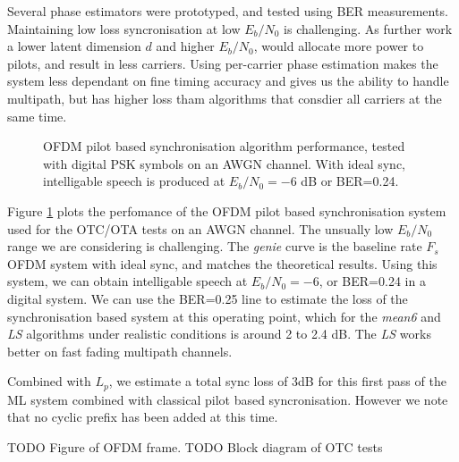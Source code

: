 \documentclass{article}
\begin{document}
Several phase estimators were prototyped, and tested using BER measurements. Maintaining low loss syncronisation at low $E_b/N_0$ is challenging.  As further work a lower latent dimension $d$ and higher $E_b/N_0$, would allocate more power to pilots, and result in less carriers.  Using per-carrier phase estimation makes the system less dependant on fine timing accuracy and gives us the ability to handle multipath, but has higher loss tham algorithms that consdier all carriers at the same time.

\begin{figure}[h]
\caption{OFDM pilot based synchronisation algorithm performance, tested with digital PSK symbols on an AWGN channel. With ideal sync, intelligable speech is produced at $E_b/N_0=-6$ dB or BER=0.24.}
\label{fig:ofdm_sync}
\begin{center}

\end{center}
\end{figure}

Figure \ref{fig:ofdm_sync} plots the perfomance of the OFDM pilot based synchronisation system used for the OTC/OTA tests on an AWGN channel.  The unsually low $E_b/N_0$ range we are considering is challenging.  The \emph{genie} curve is the baseline rate $F_s$ OFDM system with ideal sync, and matches the theoretical results.  Using this system, we can obtain intelligable speech at $E_b/N_0=-6$, or BER=0.24 in a digital system.  We can use the BER=0.25 line to estimate the loss of the synchronisation based system at this operating point, which for the \emph{mean6} and \emph{LS} algorithms under realistic conditions is around 2 to 2.4 dB. The \emph{LS} works better on fast fading multipath channels.

Combined with $L_p$, we estimate a total sync loss of 3dB for this first pass of the ML system combined with classical pilot based syncronisation. However we note that no cyclic prefix has been added at this time.

TODO Figure of OFDM frame.  TODO Block diagram of OTC tests
\end{document}
